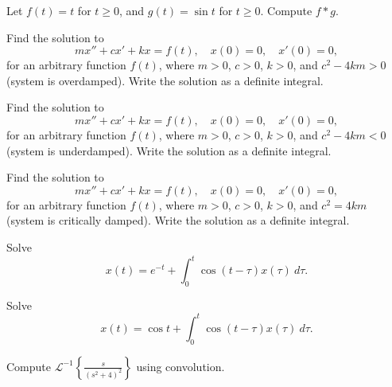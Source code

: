 \documentclass[12pt]{book}
\begin{document}
\begin{exercise}
Let $f(t) = t$ for $t \geq 0$, and $g(t) = \sin t $ for $t \geq 0$.  Compute
$f * g$.
\end{exercise}

\begin{exercise}
Find the solution to
\begin{equation*}
m x'' + c x' + k x = f(t) , \quad x(0) = 0, \quad x'(0) = 0 ,
\end{equation*}
for an arbitrary function $f(t)$, where $m > 0$, $c > 0$, $k > 0$,
and $c^2 - 4km > 0$ (system is overdamped).
Write the solution as a definite integral.
\end{exercise}

\begin{exercise}
Find the solution to
\begin{equation*}
m x'' + c x' + k x = f(t) , \quad x(0) = 0, \quad x'(0) = 0 ,
\end{equation*}
for an arbitrary function $f(t)$, where $m > 0$, $c > 0$, $k > 0$,
and $c^2 - 4km < 0$ (system is underdamped).
Write the solution as a definite integral.
\end{exercise}

\begin{exercise}
Find the solution to
\begin{equation*}
m x'' + c x' + k x = f(t) , \quad x(0) = 0, \quad x'(0) = 0 ,
\end{equation*}
for an arbitrary function $f(t)$, where $m > 0$, $c > 0$, $k > 0$,
and $c^2 = 4km$ (system is critically damped).
Write the solution as a definite integral.
\end{exercise}

\begin{exercise}
Solve
\begin{equation*}
x(t) =  e^{-t} + \int_0^t \cos(t-\tau) x(\tau) ~ d\tau .
\end{equation*}
\end{exercise}

\begin{exercise}
Solve
\begin{equation*}
x(t) =  \cos t + \int_0^t \cos(t-\tau) x(\tau) ~ d\tau .
\end{equation*}
\end{exercise}

\begin{exercise}
Compute ${\mathcal{L}}^{-1} \left\{ \frac{s}{{(s^2+4)}^2} \right\}$ using
convolution.
\end{exercise}
\end{document}
